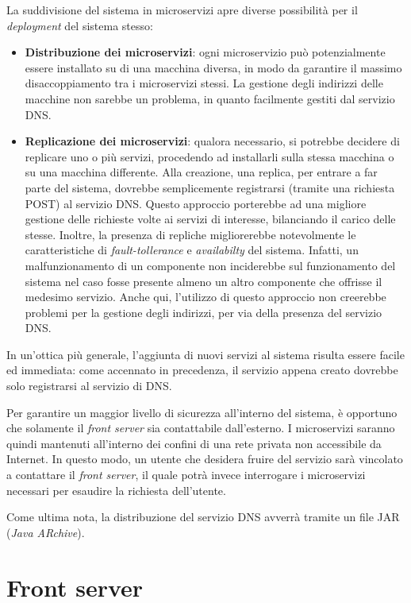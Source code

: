 \documentclass[a4paper,12pt]{report}
\begin{document}
La suddivisione del sistema in microservizi apre diverse possibilità per il \emph{deployment} del sistema stesso:
\begin{itemize}
	\item \textbf{Distribuzione dei microservizi}: ogni microservizio può potenzialmente essere installato su di una macchina diversa, in modo da garantire il massimo disaccoppiamento tra i microservizi stessi. La gestione degli indirizzi delle macchine non sarebbe un problema, in quanto facilmente gestiti dal servizio DNS.
	\item \textbf{Replicazione dei microservizi}: qualora necessario, si potrebbe decidere di replicare uno o più servizi, procedendo ad installarli sulla stessa macchina o su una macchina differente. Alla creazione, una replica, per entrare a far parte del sistema, dovrebbe semplicemente registrarsi (tramite una richiesta POST) al servizio DNS. Questo approccio porterebbe ad una migliore gestione delle richieste volte ai servizi di interesse, bilanciando il carico delle stesse. Inoltre, la presenza di repliche migliorerebbe notevolmente le caratteristiche di \emph{fault-tollerance} e \emph{availabilty} del sistema. Infatti, un malfunzionamento di un componente non inciderebbe sul funzionamento del sistema nel caso fosse presente almeno un altro componente che offrisse il medesimo servizio. Anche qui, l'utilizzo di questo approccio non creerebbe problemi per la gestione degli indirizzi, per via della presenza del servizio DNS.
\end{itemize}

In un'ottica più generale, l'aggiunta di nuovi servizi al sistema risulta essere facile ed immediata: come accennato in precedenza, il servizio appena creato dovrebbe solo registrarsi al servizio di DNS.

Per garantire un maggior livello di sicurezza all'interno del sistema, è opportuno che solamente il \emph{front server} sia contattabile dall'esterno. I microservizi saranno quindi mantenuti all'interno dei confini di una rete privata non accessibile da Internet. In questo modo, un utente che desidera fruire del servizio sarà vincolato a contattare il \emph{front server}, il quale potrà invece interrogare i microservizi necessari per esaudire la richiesta dell'utente.

Come ultima nota, la distribuzione del servizio DNS avverrà tramite un file JAR (\emph{Java ARchive}).

\section{Front server}
\end{document}
